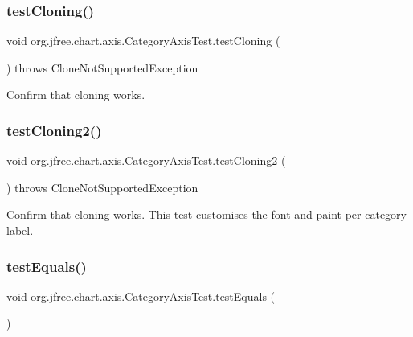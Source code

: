 \subsubsection{\texorpdfstring{test\+Cloning()}{testCloning()}}
{\footnotesize\ttfamily void org.\+jfree.\+chart.\+axis.\+Category\+Axis\+Test.\+test\+Cloning (\begin{DoxyParamCaption}{ }\end{DoxyParamCaption}) throws Clone\+Not\+Supported\+Exception}

Confirm that cloning works. \mbox{\label{classorg_1_1jfree_1_1chart_1_1axis_1_1_category_axis_test_a813ed3e625287f7ec5994e410feb1cfb}} 
\subsubsection{\texorpdfstring{test\+Cloning2()}{testCloning2()}}
{\footnotesize\ttfamily void org.\+jfree.\+chart.\+axis.\+Category\+Axis\+Test.\+test\+Cloning2 (\begin{DoxyParamCaption}{ }\end{DoxyParamCaption}) throws Clone\+Not\+Supported\+Exception}

Confirm that cloning works. This test customises the font and paint per category label. \mbox{\label{classorg_1_1jfree_1_1chart_1_1axis_1_1_category_axis_test_a960bca9b253ee6ce401705fec56228ef}} 
\subsubsection{\texorpdfstring{test\+Equals()}{testEquals()}}
{\footnotesize\ttfamily void org.\+jfree.\+chart.\+axis.\+Category\+Axis\+Test.\+test\+Equals (\begin{DoxyParamCaption}{ }\end{DoxyParamCaption})}


